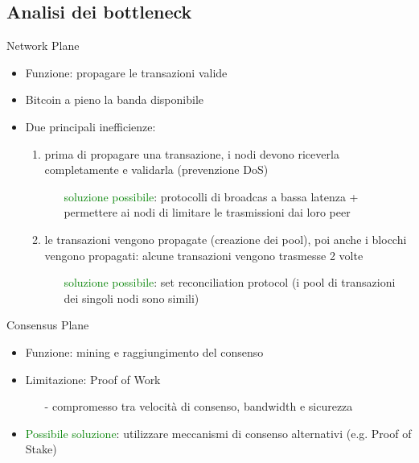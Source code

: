 \documentclass{beamer}
\begin{document}
  \subsection{Analisi dei bottleneck}
  \begin{frame}{Network Plane}
      \begin{itemize}
          \item Funzione: propagare le transazioni valide
          \item Bitcoin a pieno la banda disponibile
          \item Due principali inefficienze: 
          \begin{enumerate}
              \item prima di propagare una transazione, i nodi devono riceverla completamente e validarla (prevenzione DoS)
              \begin{itemize}
                  \item[\MVRightarrow] \textcolor{green}{soluzione possibile}:
                  protocolli di broadcas a bassa latenza + permettere ai nodi di limitare le trasmissioni dai loro peer
              \end{itemize}
              \pause
              \item le transazioni vengono propagate (creazione dei pool), poi anche i blocchi vengono propagati: alcune transazioni vengono trasmesse 2 volte
              \begin{itemize}
                  \item[\MVRightarrow] \textcolor{green}{soluzione possibile}: set reconciliation protocol (i pool di transazioni dei singoli nodi sono simili) 
              \end{itemize}
          \end{enumerate}
      \end{itemize}
  \end{frame}
  
  
  
  \begin{frame}{Consensus Plane}
      \begin{itemize}
          \item Funzione: mining e raggiungimento del consenso
          \item Limitazione: Proof of Work 
          \begin{itemize}
              \item[-] compromesso tra velocità di consenso, bandwidth e sicurezza
          \end{itemize}
          \item \textcolor{green}{Possibile soluzione}: utilizzare meccanismi di consenso alternativi (e.g. Proof of Stake) 
      \end{itemize}
  \end{frame}
  
\end{document}
